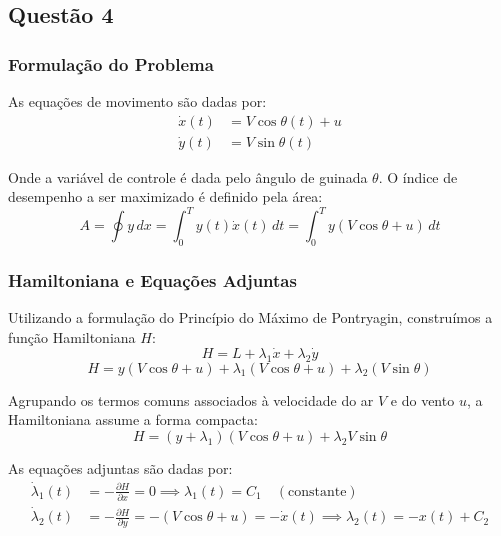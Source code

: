 \documentclass[a4paper, 12pt]{article}%
\begin{document}
\newpage

\subsection*{Questão 4}

\subsubsection*{Formulação do Problema}

As equações de movimento são dadas por: 
\begin{align}
    \dot{x}(t) &= V \cos\theta(t) + u \\
    \dot{y}(t) &= V \sin\theta(t)
\end{align}

Onde a variável de controle é dada pelo ângulo de guinada $\theta$. O índice de desempenho a ser maximizado é definido pela área:
\begin{equation}
    A = \oint y \, dx = \int_{0}^{T} y(t) \dot{x}(t) \, dt = \int_{0}^{T} y (V \cos\theta + u) \, dt
\end{equation}

\subsubsection*{Hamiltoniana e Equações Adjuntas}

Utilizando a formulação do Princípio do Máximo de Pontryagin, construímos a função Hamiltoniana $H$:
\begin{equation}
    H = L + \lambda_1 \dot{x} + \lambda_2 \dot{y}
\end{equation}
\begin{equation}
    H = y(V \cos\theta + u) + \lambda_1 (V \cos\theta + u) + \lambda_2 (V \sin\theta)
\end{equation}

Agrupando os termos comuns associados à velocidade do ar $V$ e do vento $u$, a Hamiltoniana assume a forma compacta:
\begin{equation}
    H = (y + \lambda_1)(V \cos\theta + u) + \lambda_2 V \sin\theta
\end{equation}

As equações adjuntas são dadas por:
\begin{align}
    \dot{\lambda}_1(t) &= -\frac{\partial H}{\partial x} = 0 \implies \lambda_1(t) = C_1 \quad (\text{constante}) \\
    \dot{\lambda}_2(t) &= -\frac{\partial H}{\partial y} = -(V \cos\theta + u) = -\dot{x}(t) \implies \lambda_2(t) = -x(t) + C_2
\end{align}
\end{document}

